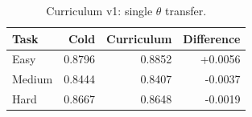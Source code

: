 \begin{table}[h]
\centering
\caption{Curriculum v1: single \(\theta\) transfer.}
\begin{tabular}{l r r r}
\hline
Task & Cold & Curriculum & Difference \\
\hline
Easy & 0.8796 & 0.8852 & +0.0056 \\
Medium & 0.8444 & 0.8407 & -0.0037 \\
Hard & 0.8667 & 0.8648 & -0.0019 \\
\hline
\end{tabular}
\end{table}
